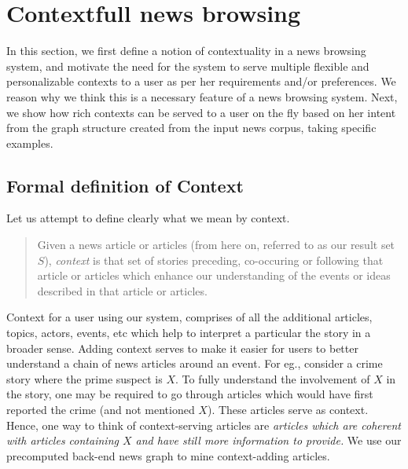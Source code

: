 \section{Contextfull news browsing}
\label{sec:newsgraph}

In this section, we first define a notion of contextuality in a news browsing system, and motivate the need for the system to serve multiple flexible and personalizable contexts to a user as per her
requirements and/or preferences. We reason why we think this is a necessary feature of a news browsing system. Next, we show how rich contexts can be served to a user on the fly based on her intent
from the graph structure created from the input news corpus, taking specific examples. 

\subsection{Formal definition of Context}
Let us attempt to define clearly what we mean by context. 
\begin{quote}
Given a news article or articles (from here on, referred to as our result set $S$), {\em context} is that set of stories
preceding, co-occuring or following that article or articles which
enhance our understanding of the events or ideas described in that article or articles.
\end{quote}

Context for a user using our system, comprises of all the additional articles, topics,
actors, events, etc which help to interpret a particular the story in a broader sense. Adding
context serves to make it easier for users to better understand a chain
of news articles around an event. For eg., consider a crime story
where the prime suspect is $X$. To fully understand the involvement of $X$ in the story,
one may be required to go through articles which would have first reported the crime (and not 
mentioned $X$). These articles serve as context. Hence, one way to think of context-serving articles
are \emph{articles which are coherent with articles containing $X$ and have still more information to provide.} We use our precomputed back-end news graph to mine context-adding articles.

